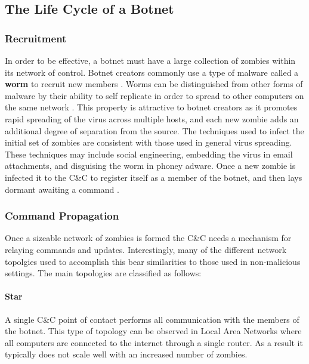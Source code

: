 \subsection{The Life Cycle of a Botnet}
\subsubsection{Recruitment}
In order to be effective, a botnet must have a large collection of zombies within its network of control.
Botnet creators commonly use a type of malware called a \textbf{worm} to recruit new members
\cite{lifecycle}.
Worms can be distinguished from other forms of malware by their ability to self replicate
in order to spread to other computers on the same network \cite{virustypes}.
This property is attractive to botnet creators as it promotes rapid spreading of the virus across
multiple hosts, and each new zombie adds an additional degree of separation from the source.
The techniques used to infect the initial set of zombies are consistent with
those used in general virus spreading.  These techniques may include social engineering,
embedding the virus in email attachments, and disguising the worm in phoney adware.
Once a new zombie is infected it  to the C\&C to register
itself as a member of the botnet, and then lays dormant awaiting a command
\cite{topology}.

\subsubsection{Command Propagation}
Once a sizeable network of zombies is formed the C\&C needs a mechanism for
relaying commands and updates. Interestingly, many of the different network topolgies
used to accomplish this bear similarities to those used in non-malicious settings.
The main topologies are classified as follows:

\paragraph{Star \cite{topology}}
A single C\&C point of contact performs all communication with the members
of the botnet. This type of topology can be observed in Local Area Networks
where all computers are connected to the internet through a single router. As a
result it typically does not scale well with an increased number of zombies.

